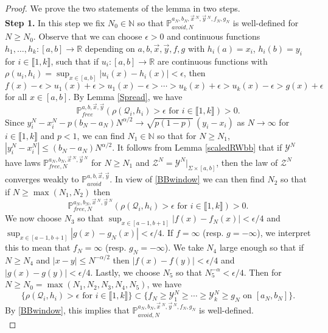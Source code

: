 \begin{proof}
	We prove the two statements of the lemma in two steps.\\
	
	\noindent\textbf{Step 1. } In this step we fix $N_0 \in \mathbb{N}$ so that $\mathbb{P}^{a_N,b_N,\vec{x}\,^N,\vec{y}\,^N,f_N,g_N}_{avoid,N}$ is well-defined for $N\geq N_0$. Observe that we can choose $\epsilon > 0$ and continuous functions $h_1,\dots,h_k : [a,b]\to\mathbb{R}$ depending on $a,b,\vec{x},\vec{y},f,g$ with $h_i(a) = x_i$, $h_i(b)=y_i$ for $i\in\llbracket 1,k\rrbracket$, such that if $u_i:[a,b]\to\mathbb{R}$ are continuous functions with $\rho(u_i,h_i) = \sup_{x\in[a,b]} |u_i(x)-h_i(x)| < \epsilon$, then
	\begin{equation}\label{scaledavoidwindow}
	f(x) - \epsilon > u_1(x) + \epsilon > u_1(x) - \epsilon > \cdots > u_k(x) + \epsilon > u_k(x) - \epsilon > g(x) + \epsilon
	\end{equation}
	for all $x\in[a,b]$. By Lemma \ref{Spread}, we have
	\begin{equation}\label{BBwindow}
	\mathbb{P}^{a,b,\vec{x},\vec{y}}_{free}(\rho(\mathcal{Q}_i,h_i) > \epsilon \mbox{ for } i\in\llbracket 1,k\rrbracket) > 0.
	\end{equation}
	Since $y_i^N - x_i^N - p(b_N-a_N)N^{\alpha/2} \to \sqrt{p(1-p)}\,(y_i-x_i)$ as $N\to\infty$ for $i\in\llbracket 1,k\rrbracket$ and $p<1$, we can find $N_1\in\mathbb{N}$ so that for $N\geq N_1$, $|y_i^N-x_i^N| \leq (b_N-a_N)N^{\alpha/2}$. It follows from Lemma \ref{scaledRWbb} that if $\mathcal{Y}^N$ have laws $\mathbb{P}^{a_N,b_N,\vec{x}\,^N,\vec{y}\,^N}_{free,N}$ for $N\geq N_1$ and $\mathcal{Z}^N = \mathcal{Y}^N|_{\Sigma\times[a,b]}$, then the law of $\mathcal{Z}^N$ converges weakly to $\mathbb{P}^{a,b,\vec{x},\vec{y}}_{avoid}$. In view of \eqref{BBwindow} we can then find $N_2$ so that if $N \geq \max(N_1,N_2)$ then
	\[
	\mathbb{P}^{a_N,b_N,\vec{x}\,^N,\vec{y}\,^N}_{free,N}(\rho(\mathcal{Q}_i,h_i) > \epsilon \mbox{ for } i\in\llbracket 1,k\rrbracket) > 0.
	\]
	We now choose $N_3$ so that $\sup_{x\in[a-1,b+1]}|f(x)-f_N(x)| < \epsilon/4$ and $\sup_{x\in[a-1,b+1]}|g(x)-g_N(x)| < \epsilon/4$. If $f=\infty$ (resp. $g=-\infty$), we interpret this to mean that $f_N=\infty$ (resp. $g_N=-\infty$). We take $N_4$ large enough so that if $N\geq N_4$ and $|x-y|\leq N^{-\alpha/2}$ then $|f(x)-f(y)|<\epsilon/4$ and $|g(x)-g(y)|<\epsilon/4$. Lastly, we choose $N_5$ so that $N_5^{-\alpha} < \epsilon/4$. Then for $N\geq N_0 = \max(N_1,N_2,N_3,N_4,N_5)$, we have
	\[
	\{\rho(\mathcal{Q}_i,h_i) > \epsilon \mbox{ for } i\in\llbracket 1,k\rrbracket\} \subset \{f_N \geq \mathcal{Y}^N_1 \geq \cdots \geq \mathcal{Y}^N_k \geq g_N \mbox{ on } [a_N,b_N]\}.
	\]
	By \eqref{BBwindow}, this implies that $\mathbb{P}^{a_N,b_N,\vec{x}\,^N,\vec{y}\,^N,f_N,g_N}_{avoid,N}$ is well-defined.\\
	

\end{proof}
